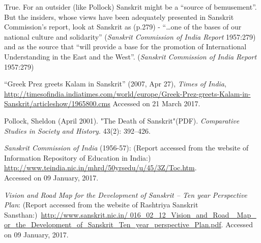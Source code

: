 True. For an outsider (like Pollock) Sanskrit might be a “source of bemusement”. But the insiders, whose views have been adequately presented in Sanskrit Commission’s report, look at Sanskrit as (p.279) - “…one of the bases of our national culture and solidarity” ({\sl Sanskrit Commission of India Report} 1957:279) and as the source that “will provide a base for the promotion of International Understanding in the East and the West”. ({\sl Sanskrit Commission of India Report} 1957:279)

\begin{thebibliography}{99}
\itemsep=2pt
“Greek Prez greets Kalam in Sanskrit” (2007, Apr 27), {\sl Times of India}, \url{http://timesofindia.indiatimes.com/world/europe/Greek-Prez-greets-Kalam-in-Sanskrit/articleshow/1965800.cms}  Accessed on 21 March 2017. 

Pollock, Sheldon (April 2001). "The Death of Sanskrit"(PDF). {\sl Comparative Studies in Society and History}. 43(2): 392--426.

{\sl Sanskrit Commission of India} (1956-57): (Report accessed from the website of Information Repository of Education in India:) \url{http://www.teindia.nic.in/mhrd/50yrsedu/u/45/3Z/Toc.htm}.\\ Accessed on 09 January, 2017.

{\sl Vision and Road Map for the Development of Sanskrit – Ten year Perspective Plan}: (Report accessed from the website 
of Rashtriya Sanskrit Sansthan:)~\url{http://www.sanskrit.nic.in/ 016_02_12_Vision_and_Road_ Map_ or_the_Development_of_Sanskrit_Ten_year_perspective_Plan.pdf}. Accessed on 09 January, 2017.
\end{thebibliography}
